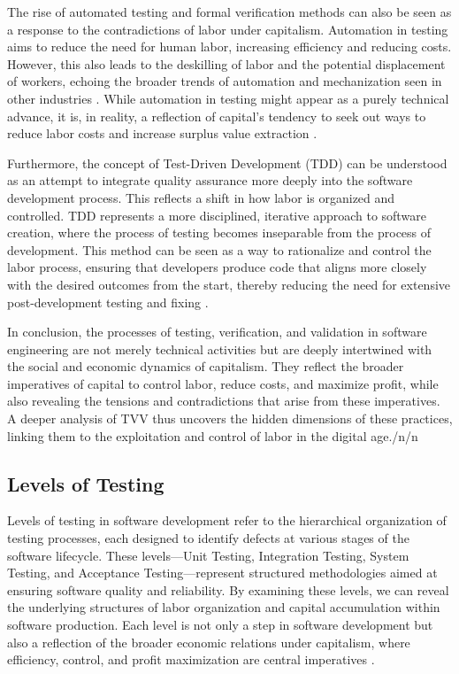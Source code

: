 \begin{refsection}
The rise of automated testing and formal verification methods can also be seen as a response to the contradictions of labor under capitalism. Automation in testing aims to reduce the need for human labor, increasing efficiency and reducing costs. However, this also leads to the deskilling of labor and the potential displacement of workers, echoing the broader trends of automation and mechanization seen in other industries \cite[pp.~67-72]{braverman1974labor}. While automation in testing might appear as a purely technical advance, it is, in reality, a reflection of capital's tendency to seek out ways to reduce labor costs and increase surplus value extraction \cite[pp.~130-135]{marx2008capital}.

Furthermore, the concept of Test-Driven Development (TDD) can be understood as an attempt to integrate quality assurance more deeply into the software development process. This reflects a shift in how labor is organized and controlled. TDD represents a more disciplined, iterative approach to software creation, where the process of testing becomes inseparable from the process of development. This method can be seen as a way to rationalize and control the labor process, ensuring that developers produce code that aligns more closely with the desired outcomes from the start, thereby reducing the need for extensive post-development testing and fixing \cite[pp.~430-435]{fuchs2014digital}.

In conclusion, the processes of testing, verification, and validation in software engineering are not merely technical activities but are deeply intertwined with the social and economic dynamics of capitalism. They reflect the broader imperatives of capital to control labor, reduce costs, and maximize profit, while also revealing the tensions and contradictions that arise from these imperatives. A deeper analysis of TVV thus uncovers the hidden dimensions of these practices, linking them to the exploitation and control of labor in the digital age./n/n\subsection{Levels of Testing}

Levels of testing in software development refer to the hierarchical organization of testing processes, each designed to identify defects at various stages of the software lifecycle. These levels—Unit Testing, Integration Testing, System Testing, and Acceptance Testing—represent structured methodologies aimed at ensuring software quality and reliability. By examining these levels, we can reveal the underlying structures of labor organization and capital accumulation within software production. Each level is not only a step in software development but also a reflection of the broader economic relations under capitalism, where efficiency, control, and profit maximization are central imperatives \cite[pp.~203-210]{marx2008capital}.


\end{refsection}
